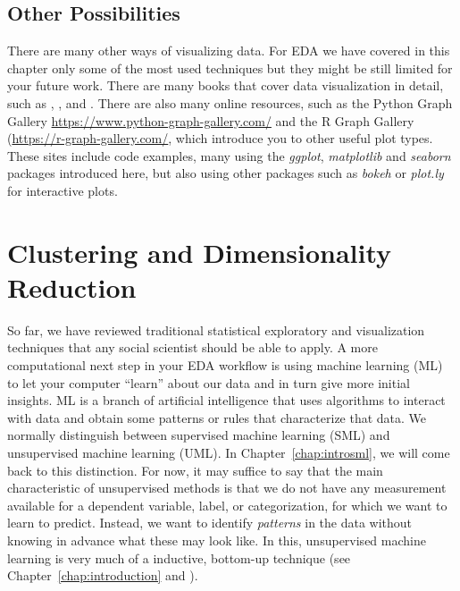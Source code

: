 



\subsection{Other Possibilities}\label{sec:plotother}

There are many other ways of visualizing data. For EDA we have covered in this chapter only some of the most used techniques but they might be still limited for your future work. There are many books that cover data visualization in detail, such as \cite{tufte2006beautiful}, \cite{cairo2019charts}, and \cite{Kirk2016}.  There are also many online resources, such as the Python Graph Gallery \url{https://www.python-graph-gallery.com/} and the R Graph Gallery (\url{https://r-graph-gallery.com/}, which introduce you to other useful plot types.  These sites include code examples, many using the \emph{ggplot}, \emph{matplotlib} and \emph{seaborn} packages introduced here, but also using other packages such as \emph{bokeh} or \emph{plot.ly} for interactive plots.


%
\section{Clustering and Dimensionality Reduction}
\label{sec:clustering}

So far, we have reviewed traditional statistical exploratory and
visualization techniques that any social scientist should be able to apply. A more
computational next step in your EDA workflow is using machine learning
(ML) to let your computer ``learn'' about our data and in turn give 
more initial insights.  ML is a branch of artificial intelligence that
uses algorithms to interact with data and obtain some patterns or
rules that characterize that data. We normally distinguish between
supervised machine learning (SML) and unsupervised machine learning
(UML). In Chapter~\ref{chap:introsml}, we will come back to this distinction.
For now, it may suffice to say that the main characteristic of
unsupervised methods is that we do not have any measurement available
for a dependent variable, label, or categorization, for which we want
to learn  to predict. Instead, we want to identify
\emph{patterns} in the data without knowing in advance what these may
look like. In this, unsupervised machine learning is very much of a
inductive, bottom-up technique (see Chapter~\ref{chap:introduction} and
\cite{Boumans2016}).

